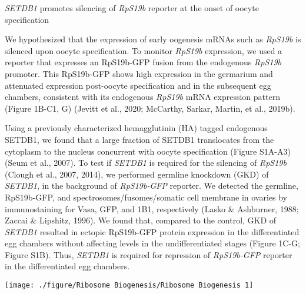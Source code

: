 \documentclass[12pt,oneside]{reedthesis}
\begin{document}
\emph{SETDB1} promotes silencing of \emph{RpS19b} reporter at the onset of oocyte specification

We hypothesized that the expression of early oogenesis mRNAs such as \emph{RpS19b} is silenced upon oocyte specification. To monitor \emph{RpS19b} expression, we used a reporter that expresses an RpS19b-GFP fusion from the endogenous \emph{RpS19b} promoter. This RpS19b-GFP shows high expression in the germarium and attenuated expression post-oocyte specification and in the subsequent egg chambers, consistent with its endogenous \emph{RpS19b} mRNA expression pattern (Figure 1B-C1, G) (Jevitt et al., 2020; McCarthy, Sarkar, Martin, et al., 2019b).

Using a previously characterized hemagglutinin (HA) tagged endogenous SETDB1, we found that a large fraction of SETDB1 translocates from the cytoplasm to the nucleus concurrent with oocyte specification (Figure S1A-A3) (Seum et al., 2007). To test if \emph{SETDB1} is required for the silencing of \emph{RpS19b} (Clough et al., 2007, 2014), we performed germline knockdown (GKD) of \emph{SETDB1}, in the background of \emph{RpS19b-GFP} reporter. We detected the germline, RpS19b-GFP, and spectrosomes/fusomes/somatic cell membrane in ovaries by immunostaining for Vasa, GFP, and 1B1, respectively (Lasko \& Ashburner, 1988; Zaccai \& Lipshitz, 1996). We found that, compared to the control, GKD of \emph{SETDB1} resulted in ectopic RpS19b-GFP protein expression in the differentiated egg chambers without affecting levels in the undifferentiated stages (Figure 1C-G; Figure S1B). Thus, \emph{SETDB1} is required for repression of \emph{RpS19b-GFP} reporter in the differentiated egg chambers.
\begin{center}\texttt{[image: ./figure/Ribosome Biogenesis/Ribosome Biogenesis 1]} \end{center}

\end{document}
